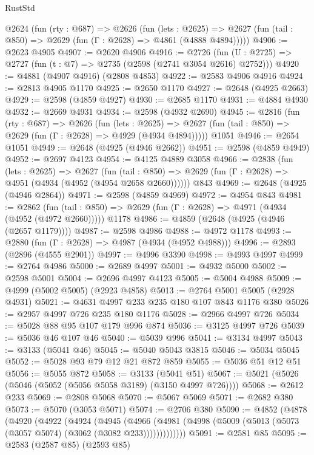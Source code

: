\begin{lexlean}{RustStd}
\begin{coremodule}
  @2624
    (fun (rty : @687) =>
    @2626
      (fun (lets : @2625) =>
      @2627 (fun (tail : @850) => @2629 (fun (Γ : @2628) => @4861 (@4888 @4894)))))
@4906 := @2623 @4905
@4907 := @2620 @4906
@4916 := @2726 (fun (U : @2725) => @2727 (fun (t : @7) => @2735 (@2598 (@2741 @3054 @2616) @2752)))
@4920 := @4881 (@4907 @4916) (@2808 @4853)
@4922 := @2583 @4906 @4916
@4924 := @2813 @4905 @1170
@4925 := @2650 @1170
@4927 := @2648 (@4925 @2663)
@4929 := @2598 (@4859 @4927)
@4930 := @2685 @1170
@4931 := @4884 @4930
@4932 := @2669 @4931
@4934 := @2598 (@4932 @2690)
@4945 := @2816
    (fun (rty : @687) =>
    @2626
      (fun (lets : @2625) =>
      @2627 (fun (tail : @850) => @2629 (fun (Γ : @2628) => @4929 (@4934 @4894)))))
    @1051
@4946 := @2654 @1051
@4949 := @2648 (@4925 (@4946 @2662))
@4951 := @2598 (@4859 @4949)
@4952 := @2697 @4123
@4954 := @4125 @4889 @3058
@4966 := @2838
    (fun (lets : @2625) =>
    @2627
      (fun (tail : @850) => @2629 (fun (Γ : @2628) => @4951 (@4934 (@4952 (@4954 @2658 @2660))))))
    @843
@4969 := @2648 (@4925 (@4946 @2864))
@4971 := @2598 (@4859 @4969)
@4972 := @4954 @843
@4981 := @2862
    (fun (tail : @850) => @2629 (fun (Γ : @2628) => @4971 (@4934 (@4952 (@4972 @2660)))))
    @1178
@4986 := @4859 (@2648 (@4925 (@4946 (@2657 @1179))))
@4987 := @2598 @4986
@4988 := @4972 @1178
@4993 := @2880 (fun (Γ : @2628) => @4987 (@4934 (@4952 @4988)))
@4996 := @2893 (@2896 (@4555 @2901))
@4997 := @4996 @3390
@4998 := @4993 @4997
@4999 := @2764 @4986
@5000 := @2689 @4997
@5001 := @4932 @5000
@5002 := @2598 @5001
@5004 := @2696 @4997 @4123
@5005 := @5004 @4988
@5009 := @4999 (@5002 @5005) (@2923 @4858)
@5013 := @2764 @5001 @5005 (@2928 @4931)
@5021 := @4631 @4997 @233 @235 @180 @107 @843 @1176 @380
@5026 := @2957 @4997 @726 @235 @180 @1176
@5028 := @2966 @4997 @726
@5034 := @5028 @88 @95 @107 @179 @996 @874
@5036 := @3125 @4997 @726
@5039 := @5036 @46 @107 @46
@5040 := @5039 @996
@5041 := @3134 @4997
@5043 := @3133 (@5041 @46)
@5045 := @5040 @5043 @3815
@5046 := @5034 @5045
@5052 := @5028 @93 @79 @12 @21 @872 @859
@5055 := @5036 @51 @12 @51
@5056 := @5055 @872
@5058 := @3133 (@5041 @51)
@5067 := @5021 (@5026 (@5046 (@5052 (@5056 @5058 @3189) (@3150 @4997 @726))))
@5068 := @2612 @233
@5069 := @2808 @5068
@5070 := @5067 @5069
@5071 := @2682 @380
@5073 := @5070 (@3053 @5071)
@5074 := @2706 @380
@5090 := @4852
    (@4878
      (@4920
        (@4922
          (@4924
            (@4945
              (@4966
                (@4981 (@4998 (@5009 (@5013 (@5073 (@3057 @5074) (@3062 (@3082 @233)))))))))))))
@5091 := @2581 @85
@5095 := @2583 (@2587 @85) (@2593 @85)

\end{coremodule}
\end{lexlean}
